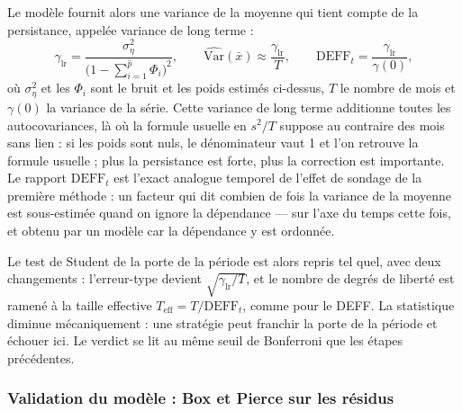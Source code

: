 Le modèle fournit alors une variance de la moyenne qui tient compte de la
persistance, appelée variance de long terme :
\[
  \gamma_{\mathrm{lr}}
     = \frac{\sigma^2_\eta}{\bigl(1-\sum_{i=1}^{\hat p}\Phi_i\bigr)^{2}},
  \qquad
  \widehat{\mathrm{Var}}(\bar x) \approx \frac{\gamma_{\mathrm{lr}}}{T},
  \qquad
  \mathrm{DEFF}_t = \frac{\gamma_{\mathrm{lr}}}{\gamma(0)},
\]
où \(\sigma^2_\eta\) et les \(\Phi_i\) sont le bruit et les poids estimés
ci-dessus, \(T\) le nombre de mois et \(\gamma(0)\) la variance de la série.
Cette variance de long
terme additionne toutes les autocovariances, là où la formule usuelle en
\(s^2/T\) suppose au contraire des mois sans lien : si les poids sont nuls,
le dénominateur vaut 1 et l'on retrouve la formule usuelle ; plus la
persistance est forte, plus la correction est importante. Le rapport
\(\mathrm{DEFF}_t\) est l'exact analogue temporel de l'effet de sondage de la
première méthode : un facteur qui dit combien de fois la variance de la
moyenne est sous-estimée quand on ignore la dépendance — sur l'axe du temps
cette fois, et obtenu par un modèle car la dépendance y est ordonnée.

Le test de Student de la porte de la période est alors repris tel quel, avec
deux changements : l'erreur-type devient
\(\sqrt{\gamma_{\mathrm{lr}}/T}\), et le nombre de degrés de liberté est
ramené à la taille effective \(T_{\mathrm{eff}} = T/\mathrm{DEFF}_t\), comme
pour le DEFF. La statistique diminue mécaniquement : une stratégie peut
franchir la porte de la période et échouer ici. Le verdict se lit au même
seuil de Bonferroni que les étapes précédentes.

\subsubsection*{Validation du modèle : Box et Pierce sur les résidus}

